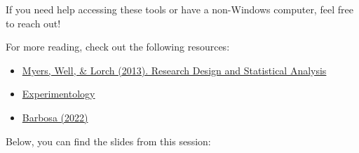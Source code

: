 \documentclass[
  letterpaper,
  DIV=11,
  numbers=noendperiod]{scrreprt}
\providecommand{\tightlist}{%
  \setlength{\itemsep}{0pt}\setlength{\parskip}{0pt}}\usepackage{longtable,booktabs,array}
\begin{document}
If you need help accessing these tools or have a non-Windows computer,
feel free to reach out!

\begin{tcolorbox}[enhanced jigsaw, opacitybacktitle=0.6, arc=.35mm, colbacktitle=quarto-callout-tip-color!10!white, bottomrule=.15mm, titlerule=0mm, coltitle=black, title=\textcolor{quarto-callout-tip-color}{\faLightbulb}\hspace{0.5em}{Relevant readings}, toprule=.15mm, left=2mm, colback=white, rightrule=.15mm, bottomtitle=1mm, colframe=quarto-callout-tip-color-frame, opacityback=0, toptitle=1mm, breakable, leftrule=.75mm]

For more reading, check out the following resources:

\begin{itemize}
\tightlist
\item
  \href{https://granatensis.ugr.es/discovery/fulldisplay?docid=alma991014333689904990\&context=L\&vid=34CBUA_UGR:VU1}{Myers,
  Well, \& Lorch (2013). Research Design and Statistical Analysis}
\item
  \href{https://experimentology.io/}{Experimentology}
\item
  \href{https://jmourabarbosa.github.io/files/Barbosa_2022_BRM.pdf}{Barbosa
  (2022)}
\end{itemize}

\end{tcolorbox}

Below, you can find the slides from this session:
\end{document}
